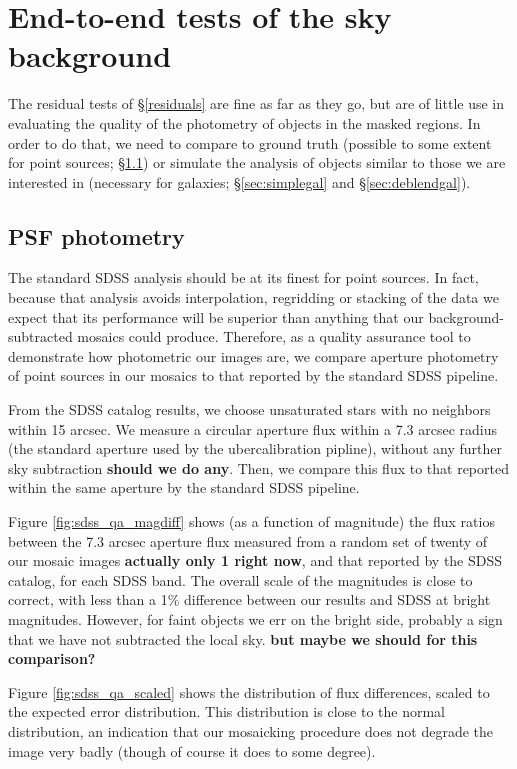 \documentclass[10pt,preprint]{aastex}
\begin{document}
\section{ End-to-end tests of the sky background}
\label{sec:endtoend}

The residual tests of \S\ref{residuals} are fine as far as they go,
but are of little use in evaluating the quality of the photometry of
objects in the masked regions.  In order to do that, we need to
compare to ground truth (possible to some extent for point sources;
\S\ref{sec:psfs}) or simulate the analysis of objects similar to
those we are interested in (necessary for galaxies;
\S\ref{sec:simplegal} and \S\ref{sec:deblendgal}).

\subsection{ PSF photometry}
\label{sec:psfs}

The standard SDSS analysis should be at its finest for point sources.
In fact, because that analysis avoids interpolation, regridding or
stacking of the data we expect that its performance will be superior
than anything that our background-subtracted mosaics could
produce. Therefore, as a quality assurance tool to demonstrate how
photometric our images are, we compare aperture photometry of
point sources in our mosaics to that reported by the standard SDSS
pipeline. 

From the SDSS catalog results, we choose unsaturated stars with no
neighbors within 15 arcsec.  We measure a circular aperture flux
within a 7.3 arcsec radius (the standard aperture used by the
ubercalibration pipline), without any further sky subtraction {\bf
should we do any}. Then, we compare this flux to that reported within
the same aperture by the standard SDSS pipeline.

Figure \ref{fig:sdss_qa_magdiff} shows (as a function of magnitude)
the flux ratios between the 7.3 arcsec aperture flux measured from a
random set of twenty of our mosaic images {\bf actually only 1 right
now}, and that reported by the SDSS catalog, for each SDSS band. The
overall scale of the magnitudes is close to correct, with less than a
1\% difference between our results and SDSS at bright magnitudes.
However, for faint objects we err on the bright side, probably a sign
that we have not subtracted the local sky. {\bf but maybe we should
for this comparison?}

Figure \ref{fig:sdss_qa_scaled} shows the distribution of flux
differences, scaled to the expected error distribution. This
distribution is close to the normal distribution, an indication that
our mosaicking procedure does not degrade the image very badly (though
of course it does to some degree).
\end{document}

